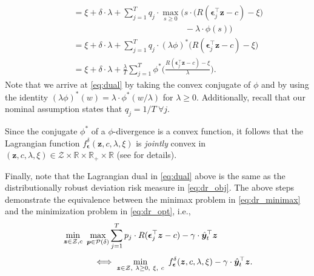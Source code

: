 \documentclass[10pt, twocolumn]{article}
\theoremstyle{plain}
\theoremstyle{definition}
\begin{document}
\begin{appendices}
\begin{align}
	&\hspace{20pt}= \xi + \delta\cdot\lambda + \sum_{j=1}^T q_j\cdot \max_{s\geq 0} \Big(s\cdot \big(R(\bm{\epsilon}_j^\top \bm{z} - c) - \xi\big)\nonumber\\[-1ex]
	&\hspace{178pt} - \lambda\cdot \phi(s)\Big)\nonumber\\
	&\hspace{20pt}= \xi + \delta\cdot\lambda + \sum_{j=1}^T q_j\cdot (\lambda \phi)^*\big(R(\bm{\epsilon}_j^\top \bm{z} - c) - \xi\big)\nonumber\\
	&\hspace{20pt}=\xi + \delta\cdot \lambda + \frac{\lambda}{T}
   \sum_{j=1}^T \phi^*\bigg(\frac{R(\bm{\epsilon}_j^\top \bm{z} -
   c) - \xi}{\lambda}\bigg).\label{eq:dual}
\end{align}
Note that we arrive at \eqref{eq:dual} by taking the convex conjugate of
\(\phi\) and by using the identity \((\lambda \phi)^*(w) = \lambda\cdot
\phi^*(w/\lambda)\) for \(\lambda\geq 0\). Additionally, recall that our
nominal assumption states that \(q_j = 1/T\ \forall j\).  

Since the conjugate \(\phi^*\) of a \(\phi\)-divergence is a convex
function, it follows that the Lagrangian function 
\(f_{\bm{\epsilon}}^{\delta}(\bm{z}, c, \lambda, \xi)\) is \emph{jointly} 
convex in \((\bm{z},c,\lambda,\xi) \in \mathcal{Z} \times \mathbb{R} \times
\mathbb{R}_+ \times \mathbb{R}\) (see \citet{ben2013robust} for details).

Finally, note that the Lagrangian dual in \eqref{eq:dual} above is the same
as the distributionally robust deviation risk measure in \eqref{eq:dr_obj}. 
The above steps demonstrate the equivalence between the minimax problem in 
\eqref{eq:dr_minimax} and the minimization problem in \eqref{eq:dr_opt}, i.e.,
\begin{align*}
	&\min_{\bm{z}\in\mathcal{Z}, c}\ \max_{\bm{p}\in\mathcal{P}(\delta)} 
		\sum_{j=1}^T p_j \cdot R(\bm{\epsilon}_j^\top \bm{z} - c) 
		- \gamma \cdot \hat{\bm{y}}_{t}^\top \bm{z}\\[1ex]
	&\hspace*{35pt} \iff 
		\min_{\bm{z}\in\mathcal{Z},\ \lambda\geq 0,\ \xi,\ c}\ 
		f_{\bm{\epsilon}}^{\delta}(\bm{z}, c, \lambda, \xi) 
		- \gamma \cdot \hat{\bm{y}}_{t}^\top \bm{z}.
\end{align*}


\end{appendices}
\end{document}

